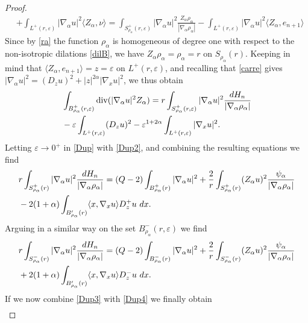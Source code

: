 \documentclass[11pt]{amsart}
\theoremstyle{plain}
\numberwithin{equation}{section}
\begin{document}
\begin{proof}
\begin{align*}
& + \int_{L^+(r,{\varepsilon})} |{\nabla_\alpha} u|^2 \langle Z_\alpha,\nu\rangle = \int_{S^+_{\rho_\alpha}(r,{\varepsilon})} |{\nabla_\alpha} u|^2 \frac{Z_\alpha \rho_\alpha}{|{\nabla_\alpha} \rho_\alpha|}  -  \int_{L^+(r,{\varepsilon})} |{\nabla_\alpha} u|^2 \langle Z_\alpha,e_{n+1}\rangle
\end{align*}
Since by \eqref{ra} the function $\rho_\alpha$ is homogeneous of degree one with respect to the non-isotropic dilations \eqref{dilB}, we have $Z_\alpha \rho_\alpha = \rho_\alpha = r$ on $S_{\rho_\alpha}(r)$. Keeping in mind that $\langle Z_\alpha,e_{n+1}\rangle = z = {\varepsilon}$ on $L^+(r,{\varepsilon})$, and recalling that \eqref{carre} gives $|\nabla_\alpha u|^2=(D_z u)^2+ |z|^{2\alpha} |\nabla_x u|^2$, we thus obtain
\begin{align}\label{Dup2}
& \int_{B^+_{\rho_\alpha}(r,{\varepsilon})} \operatorname{div}(|{\nabla_\alpha} u|^2 Z_\alpha) =  r \int_{S^+_{\rho_\alpha}(r,{\varepsilon})} |{\nabla_\alpha} u|^2 \frac{dH_n}{|{\nabla_\alpha} \rho_\alpha|}
\\
& -  {\varepsilon} \int_{L^+(r,{\varepsilon})} (D_z u)^2 -  {\varepsilon}^{1+2\alpha} \int_{L^+(r,{\varepsilon})} |\nabla_x u|^2.
\notag
\end{align}
Letting ${\varepsilon}\to 0^+$ in \eqref{Dup} with \eqref{Dup2}, and combining the resulting equations we find
\begin{align}\label{Dup3}
& r \int_{S^+_{\rho_\alpha}(r)} |{\nabla_\alpha} u|^2 \frac{dH_n}{|{\nabla_\alpha} \rho_\alpha|} = (Q - 2) \int_{B^+_{\rho_\alpha}(r)} |{\nabla_\alpha} u|^2 + \frac 2r \int_{S^+_{\rho_\alpha}(r)}  (Z_\alpha u)^2 \frac{\psi_\alpha}{|{\nabla_\alpha} \rho_\alpha|}
\\
&
- 2 (1+\alpha) \int_{B'_{\rho_\alpha}(r)}  \langle x,\nabla_x u\rangle  D^+_z u\ dx.
\notag
\end{align}
Arguing in a similar way on the set $B^-_{\rho_\alpha}(r,{\varepsilon})$ we find
\begin{align}\label{Dup4}
& r \int_{S^-_{\rho_\alpha}(r)} |{\nabla_\alpha} u|^2 \frac{dH_n}{|{\nabla_\alpha} \rho_\alpha|} = (Q - 2) \int_{B^-_{\rho_\alpha}(r)} |{\nabla_\alpha} u|^2 + \frac 2r \int_{S^-_{\rho_\alpha}(r)}  (Z_\alpha u)^2 \frac{\psi_\alpha}{|{\nabla_\alpha} \rho_\alpha|}
\\
&
+ 2 (1+\alpha) \int_{B'_{\rho_\alpha}(r)}  \langle x,\nabla_x u\rangle  D^-_z u\ dx.
\notag
\end{align}
If we now combine \eqref{Dup3} with \eqref{Dup4} we finally obtain
\begin{align}\label{Dup5}

\end{align}
\end{proof}
\end{document}

